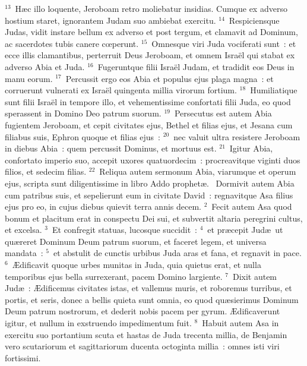 ${}^{13}$~H\ae c illo loquente, Jeroboam retro moliebatur insidias. Cumque ex adverso hostium staret, ignorantem Judam suo ambiebat exercitu.
${}^{14}$~Respiciensque Judas, vidit instare bellum ex adverso et post tergum, et clamavit ad Dominum, ac sacerdotes tubis canere cœperunt.
${}^{15}$~Omnesque viri Juda vociferati sunt~: et ecce illis clamantibus, perterruit Deus Jeroboam, et omnem Isra\"el qui stabat ex adverso Abia et Juda.
${}^{16}$~Fugeruntque filii Isra\"el Judam, et tradidit eos Deus in manu eorum.
${}^{17}$~Percussit ergo eos Abia et populus ejus plaga magna~: et corruerunt vulnerati ex Isra\"el quingenta millia virorum fortium.
${}^{18}$~Humiliatique sunt filii Isra\"el in tempore illo, et vehementissime confortati filii Juda, eo quod sperassent in Domino Deo patrum suorum.
${}^{19}$~Persecutus est autem Abia fugientem Jeroboam, et cepit civitates ejus, Bethel et filias ejus, et Jesana cum filiabus suis, Ephron quoque et filias ejus~:
${}^{20}$~nec valuit ultra resistere Jeroboam in diebus Abia~: quem percussit Dominus, et mortuus est.
${}^{21}$~Igitur Abia, confortato imperio suo, accepit uxores quatuordecim~: procreavitque viginti duos filios, et sedecim filias.
${}^{22}$~Reliqua autem sermonum Abia, viarumque et operum ejus, scripta sunt diligentissime in libro Addo prophet\ae .
~\lettrine[lines=10,image=true,loversize=0.05,lraise=-0.03]{D}{}ormivit autem Abia cum patribus suis, et sepelierunt eum in civitate David~: regnavitque Asa filius ejus pro eo, in cujus diebus quievit terra annis decem.
${}^{2}$~Fecit autem Asa quod bonum et placitum erat in conspectu Dei sui, et subvertit altaria peregrini cultus, et excelsa.
${}^{3}$~Et confregit statuas, lucosque succidit~:
${}^{4}$~et pr\ae cepit Jud\ae\ ut qu\ae reret Dominum Deum patrum suorum, et faceret legem, et universa mandata~:
${}^{5}$~et abstulit de cunctis urbibus Juda aras et fana, et regnavit in pace.
${}^{6}$~\AE dificavit quoque urbes munitas in Juda, quia quietus erat, et nulla temporibus ejus bella surrexerant, pacem Domino largiente.
${}^{7}$~Dixit autem Jud\ae~: \AE dificemus civitates istas, et vallemus muris, et roboremus turribus, et portis, et seris, donec a bellis quieta sunt omnia, eo quod qu\ae sierimus Dominum Deum patrum nostrorum, et dederit nobis pacem per gyrum. \AE dificaverunt igitur, et nullum in exstruendo impedimentum fuit.
${}^{8}$~Habuit autem Asa in exercitu suo portantium scuta et hastas de Juda trecenta millia, de Benjamin vero scutariorum et sagittariorum ducenta octoginta millia~: omnes isti viri fortissimi.


